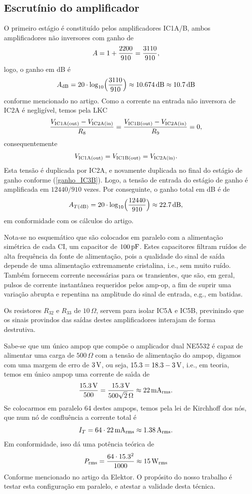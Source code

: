 \documentclass[12pt, a4paper, leqno, twoside]{book}
\def\ampop{amp-op}
\def\db{{\rm dB}}
\def\[{\begin{equation}}
\def\]{\end{equation}}
\begin{document}
  \subsection{Escrut\'inio do amplificador}

  O primeiro est\'agio \'e constitu\'ido pelos amplificadores IC1A/B, ambos amplificadores n\~ao inversores com ganho de
  \[
   A=1+{2200\over910}={3110\over 910},
  \]
  logo, o ganho em dB \'e
  \[
    A_{\db}=20\cdot\log_{10}\Bigl({3110\over910}\Bigr)\approx 10.674\,\db\approx 10.7\,\db
  \]
  conforme mencionado no artigo. Como a corrente na entrada n\~ao inversora de IC2A \'e neglig\'ivel, temos pela LKC
  \[
    {V_{\rm IC1A(out)}-V_{\rm IC2A(in)}\over R_8}={V_{\rm IC1B(out)}-V_{\rm IC2A(in)}\over R_9}=0,
  \]
  consequentemente
  \[
    V_{\rm IC1A(out)}=V_{\rm IC1B(out)}=V_{\rm IC2A(in)}.
  \]
  Esta tens\~ao \'e duplicada por IC2A, e novamente duplicada no final do est\'agio de ganho conforme (\ref{ganho_IC3B}). Logo, a tens\~ao de entrada do est\'agio de ganho \'e amplificada em $12440/910$ vezes. Por conseguinte, o ganho total em dB \'e de
  \[
    A_{T(\db)}=20\cdot\log_{10}\Bigl({12440\over910}\Bigr)\approx 22.7\,\db,
  \]
  em conformidade com os c\'alculos do artigo.

   

  Nota-se no esquem\'atico que s\~ao colocados em paralelo com a alimenta\c c\~ao sim\'etrica de cada CI, um capacitor de $100\,\rm pF$. Estes capacitores filtram ru\'idos de alta frequ\^encia da fonte de alimenta\c c\~ao, pois a qualidade do sinal de sa\'ida depende de uma alimenta\c c\~ao extremamente cristalina, i.e., sem muito ru\'ido. Tamb\'em fornecem corrente necess\'arias para os transientes, que s\~ao, em geral, pulsos de corrente instant\^anea requeridos pelos \ampop, a fim de suprir uma varia\c c\~ao abrupta e repentina na amplitude do sinal de entrada, e.g., em batidas.

  Os resistores $R_{32}$ e $R_{33}$ de $10\,\Omega$, servem para isolar IC5A e IC5B, previnindo que os sinais provindos das sa\'idas destes amplificadores interajam de forma destrutiva. 

  Sabe-se que um \'unico ampop que comp\~oe o amplicador dual NE5532 \'e capaz de alimentar uma carga de $500\,\Omega$ com a tens\~ao de alimenta\c c\~ao do ampop, digamos com uma margem de erro de $3\,\hbox{V}$, ou seja, $15.3=18.3-3\,\hbox{V}$, i.e., em teoria, temos em \'unico ampop uma corrente de sa\'\i da de 
  $$
    {15.3\,\hbox{V}\over 500}={15.3\,\hbox{V}\over 500\sqrt2\,\Omega}\approx22\,\hbox{mA}_{\rm rms}.
  $$
  Se colocarmos em paralelo 64 destes ampops, temos pela lei de Kirchhoff dos n\'os, que num n\'o de conflu\^encia a corrente total \'e
  $$
    I_T=64\cdot22\,\hbox{mA}_{\rm rms}\approx1.38\,\hbox{A}_{\rm rms}.
  $$
  Em conformidade, isso d\'a uma pot\^encia te\'orica de 
  $$
    P_{\rm rms}={64\cdot15.3^2\over1000}\approx15\,\hbox{W}_{\rm rms}
  $$
  Conforme mencionado no artigo da Elektor. O prop\'osito do nosso trabalho \'e testar esta configura\c c\~ao em paralelo, e atestar a validade desta t\'ecnica.
\end{document}
